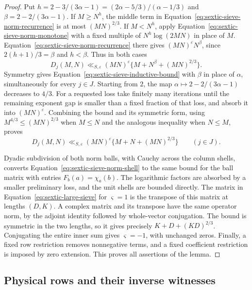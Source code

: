 \documentclass[11pt,a4paper]{article}
\numberwithin{equation}{section}
\numberwithin{figure}{section}
\theoremstyle{definition}
\theoremstyle{remark}
\begin{document}
\begin{proof}
Put $h=2-3/(3\alpha-1)=(2\alpha-5/3)/(\alpha-1/3)$ and
$\beta=2-2/(3\alpha-1)$.  If $M\ge N^h$,
the middle term in Equation~\eqref{eq:sextic-sieve-norm-recurrence} is at
most $(MN)^{2/3}$.  If $M<N^h$, apply
Equation~\eqref{eq:sextic-sieve-norm-monotone} with a fixed multiple of
$N^h\log(2MN)$ in place of $M$.  Equation~\eqref{eq:sextic-sieve-norm-recurrence}
there gives $(MN)^\varepsilon N^\beta$, since
$2(h+1)/3=\beta$ and $h<\beta$.  Thus in both cases
\[
 D_j(M,N)\ll_{S,\varepsilon}(MN)^\varepsilon
                   \{M+N^\beta+(MN)^{2/3}\}.
\]
Symmetry gives Equation~\eqref{eq:sextic-sieve-inductive-bound} with
$\beta$ in place of $\alpha$, simultaneously for every $j\in J$.
Starting from $2$, the map $\alpha\mapsto2-2/(3\alpha-1)$ decreases to
$4/3$.  For a requested loss take finitely many iterations until the
remaining exponent gap is smaller than a fixed fraction of that loss, and
absorb it into $(MN)^\varepsilon$.  Combining the bound and its symmetric
form, using
$M^{4/3}\le(MN)^{2/3}$ when $M\le N$ and the analogous inequality when
$N\le M$, proves
\begin{equation}\label{eq:sextic-sieve-norm-shell}
 D_j(M,N)\ll_{S,\varepsilon}(MN)^\varepsilon
               \{M+N+(MN)^{2/3}\}\qquad(j\in J).
\end{equation}

Dyadic subdivision of both norm balls, with Cauchy across the column
shells, converts Equation~\eqref{eq:sextic-sieve-norm-shell} to the same
bound for the ball matrix with entries $F_b(a)=\chi_a(b)$.  The logarithmic
factors are absorbed by a smaller preliminary loss, and the unit shells
are bounded directly.  The matrix in Equation~\eqref{eq:sextic-large-sieve}
for $\varsigma=1$ is the transpose of this matrix at lengths $(D,K)$.
A complex matrix and its transpose have the same operator norm, by the
adjoint identity followed by whole-vector conjugation.  The bound is
symmetric in the two lengths, so it gives precisely
$K+D+(KD)^{2/3}$.  Conjugating the entire inner sum gives
$\varsigma=-1$, with unchanged zeros.  Finally, a fixed row restriction
removes nonnegative terms, and a fixed coefficient restriction is imposed
by zero extension.  This proves all assertions of the lemma.
\end{proof}

\subsection{Physical rows and their inverse witnesses}
\end{document}
